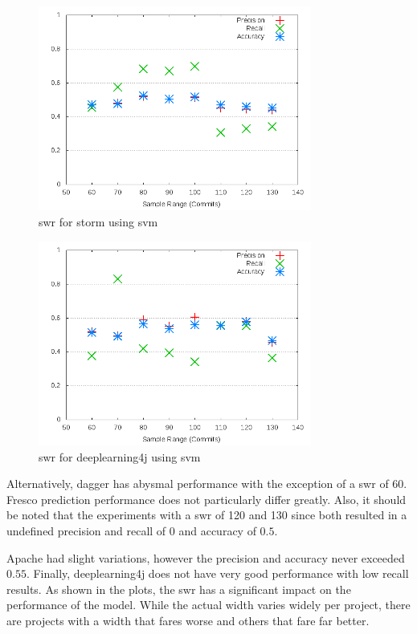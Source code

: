 \begin{figure}[!h]
    \centering
        \includegraphics[width=0.8\textwidth]{images/svm/test_1/storm_sample_range}
        \caption{\gls{swr} for storm using \gls{svm}}
        \label{fig:test_1_storm_svm}
\end{figure}

\begin{figure}[h]
    \centering
        \includegraphics[width=0.8\textwidth]{images/svm/test_1/deeplearning4j_sample_range}
    \caption{\gls{swr} for deeplearning4j using \gls{svm}}
    \label{fig:test_1_deeplearning4j_svm}
\end{figure}

Alternatively, dagger has abysmal performance with the exception of a \gls{swr} of 60. Fresco prediction performance does not particularly differ greatly. Also, it should be noted that the experiments with a \gls{swr} of 120 and 130 since both resulted in a undefined precision and recall of 0 and accuracy of $0.5$.

Apache had slight variations, however the precision and accuracy never exceeded $0.55$. Finally, deeplearning4j does not have very good performance with low recall results. As shown in the plots, the \gls{swr} has a significant impact on the performance of the model. While the actual width varies widely per project, there are projects with a width that fares worse and others that fare far better.

